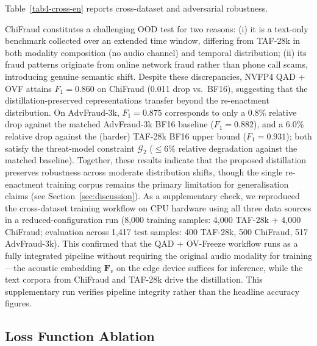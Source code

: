 \documentclass[final,5p,times,number]{elsarticle}
\begin{document}
Table~\ref{tab4-cross-en} reports cross-dataset and adversarial robustness.

ChiFraud constitutes a challenging OOD test for two reasons: (i) it is a text-only benchmark collected over an extended time window, differing from TAF-28k in both modality composition (no audio channel) and temporal distribution; (ii) its fraud patterns originate from online network fraud rather than phone call scams, introducing genuine semantic shift. Despite these discrepancies, NVFP4 QAD + OVF attains $F_1 = 0.860$ on ChiFraud (0.011 drop vs.\ BF16), suggesting that the distillation-preserved representations transfer beyond the re-enactment distribution. On AdvFraud-3k, $F_1 = 0.875$ corresponds to only a 0.8\% relative drop against the matched AdvFraud-3k BF16 baseline ($F_1=0.882$), and a 6.0\% relative drop against the (harder) TAF-28k BF16 upper bound ($F_1=0.931$); both satisfy the threat-model constraint $\mathcal{G}_2$ ($\le 6\%$ relative degradation against the matched baseline). Together, these results indicate that the proposed distillation preserves robustness across moderate distribution shifts, though the single re-enactment training corpus remains the primary limitation for generalisation claims (see Section~\ref{sec:discussion}). As a supplementary check, we reproduced the cross-dataset training workflow on CPU hardware using all three data sources in a reduced-configuration run (8{,}000 training samples: 4{,}000 TAF-28k + 4{,}000 ChiFraud; evaluation across 1{,}417 test samples: 400 TAF-28k, 500 ChiFraud, 517 AdvFraud-3k). This confirmed that the QAD + OV-Freeze workflow runs as a fully integrated pipeline without requiring the original audio modality for training---the acoustic embedding $\bm{F}_v$ on the edge device suffices for inference, while the text corpora from ChiFraud and TAF-28k drive the distillation. This supplementary run verifies pipeline integrity rather than the headline accuracy figures.

\subsection{Loss Function Ablation}\label{sec:loss-ablation}
\end{document}

